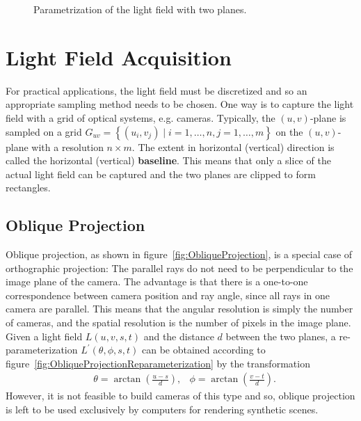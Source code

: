 \begin{figure}
	\centering
	
	\caption{Parametrization of the light field with two planes.}
	\label{fig:LightFieldParametrization}
\end{figure}

\section{Light Field Acquisition}

For practical applications, the light field must be discretized and so an appropriate sampling method needs to be chosen.
One way is to capture the light field with a grid of optical systems, e.g. cameras.
Typically, the $(u, v)$-plane is sampled on a grid $G_{uv} = \left \{ \left( u_i, v_j \right) \mid i = 1,\dots, n, j = 1, \dots, m\right \}$ on the $(u, v)$-plane with a resolution $n \times m$.
The extent in horizontal (vertical) direction is called the horizontal (vertical) \textbf{baseline}.
This means that only a slice of the actual light field can be captured and the two planes are clipped to form rectangles.



\subsection*{Oblique Projection}

Oblique projection, as shown in figure~\ref{fig:ObliqueProjection}, is a special case of orthographic projection: The parallel rays do not need to be perpendicular to the image plane of the camera.
The advantage is that there is a one-to-one correspondence between camera position and ray angle, since all rays in one camera are parallel.
This means that the angular resolution is simply the number of cameras, and the spatial resolution is the number of pixels in the image plane.
Given a light field $L(u, v, s, t)$ and the distance $d$ between the two planes, a re-parameterization $L^{\prime}(\theta, \phi, s, t)$ can be obtained according to figure~\ref{fig:ObliqueProjectionReparameterization} by the transformation
\begin{align*}
		& \theta = \arctan\left(\frac{u - s}{d}\right), & \phi = \arctan\left(\frac{v - t}{d}\right).
\end{align*}
However, it is not feasible to build cameras of this type and so, oblique projection is left to be used exclusively by computers for rendering synthetic scenes.


